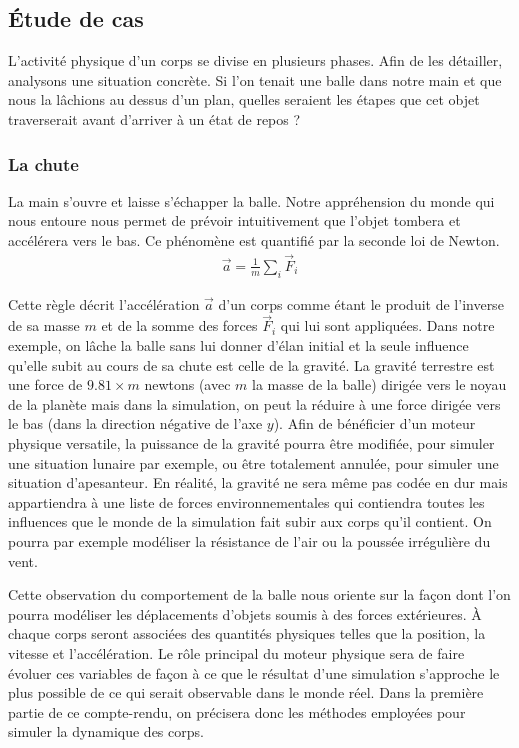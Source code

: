 \subsection{\'Etude de cas}

L'activité physique d'un corps se divise en plusieurs phases. Afin de
les détailler, analysons une situation concrète. Si l'on tenait une
balle dans notre main et que nous la lâchions au dessus d'un plan,
quelles seraient les étapes que cet objet traverserait avant d'arriver
à un état de repos ?

\subsubsection{La chute}

La main s'ouvre et laisse s'échapper la balle. Notre appréhension du
monde qui nous entoure nous permet de prévoir intuitivement que
l'objet tombera et accélérera vers le bas. Ce phénomène est quantifié
par la seconde loi de Newton.
\begin{align*}
  \vec{a} = \frac{1}{m} \sum_i \vec{F}_i
\end{align*}

Cette règle décrit l'accélération $\vec{a}$ d'un corps comme étant le
produit de l'inverse de sa masse $m$ et de la somme des forces
$\vec{F}_i$ qui lui sont appliquées. Dans notre exemple, on lâche la
balle sans lui donner d'élan initial et la seule influence qu'elle
subit au cours de sa chute est celle de la gravité. La gravité
terrestre est une force de $9.81 \times m$ newtons (avec $m$ la masse de la
balle) dirigée vers le noyau de la planète mais dans la simulation, on
peut la réduire à une force dirigée vers le bas (dans la direction
négative de l'axe $y$). Afin de bénéficier d'un moteur physique
versatile, la puissance de la gravité pourra être modifiée, pour
simuler une situation lunaire par exemple, ou être totalement annulée,
pour simuler une situation d'apesanteur. En réalité, la gravité ne
sera même pas codée \og en dur \fg{} mais appartiendra à une liste de
forces environnementales qui contiendra toutes les influences que le
monde de la simulation fait subir aux corps qu'il contient. On pourra
par exemple modéliser la résistance de l'air ou la poussée irrégulière
du vent.

Cette observation du comportement de la balle nous oriente sur la
façon dont l'on pourra modéliser les déplacements d'objets soumis à
des forces extérieures. \`A chaque corps seront associées des
quantités physiques telles que la position, la vitesse et
l'accélération. Le rôle principal du moteur physique sera de faire
évoluer ces variables de façon à ce que le résultat d'une simulation
s'approche le plus possible de ce qui serait observable dans le monde
réel. Dans la première partie de ce compte-rendu, on précisera donc
les méthodes employées pour simuler la dynamique des corps.

